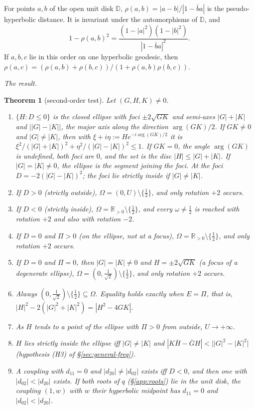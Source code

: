 \documentclass[11pt,reqno]{amsart}
\theoremstyle{plain}
\newtheorem*{theorem}{Theorem}
\theoremstyle{definition}
\theoremstyle{remark}
\newcommand{\R}{\mathbb{R}}
\begin{document}
For points $a,b$ of the open unit disk $\mathbb D$, $\rho(a,b)=|a-b|/|1-\bar ba|$ is the
pseudo-hyperbolic distance. It is invariant under the automorphisms of $\mathbb D$, and
\begin{equation}\label{eq:app-rho}
  1-\rho(a,b)^{2}=\frac{(1-|a|^{2})(1-|b|^{2})}{|1-\bar ba|^{2}} .
\end{equation}
If $a,b,c$ lie in this order on one hyperbolic geodesic, then
$\rho(a,c)=(\rho(a,b)+\rho(b,c))/(1+\rho(a,b)\rho(b,c))$.

\medskip\noindent\emph{The result.}

\begin{theorem}[second-order test]
Let $(G,H,K)\ne0$.
\begin{enumerate}
\item[(a)] $\{H:D\le0\}$ is the closed ellipse with foci $\pm2\sqrt{GK}$ and semi-axes $|G|+|K|$ and
$\bigl||G|-|K|\bigr|$, the major axis along the direction $\arg(GK)/2$. If $GK\ne0$ and $|G|\ne|K|$, then with
$\xi+i\eta:=He^{-i\arg(GK)/2}$ it is $\xi^{2}/(|G|+|K|)^{2}+\eta^{2}/(|G|-|K|)^{2}\le1$. If $GK=0$, the angle
$\arg(GK)$ is undefined, both foci are $0$, and the set is the disc $|H|\le|G|+|K|$. If $|G|=|K|\ne0$, the
ellipse is the segment joining the foci. At the foci $D=-2(|G|-|K|)^{2}$; the foci lie strictly inside if
$|G|\ne|K|$.
\item[(b)] If $D>0$ (strictly outside), $\Omega=(0,U)\setminus\{\frac12\}$, and only rotation $+2$ occurs.
\item[(c)] If $D<0$ (strictly inside), $\Omega=\R_{>0}\setminus\{\frac12\}$, and every $\omega\ne\frac12$ is
reached with rotation $+2$ and also with rotation $-2$.
\item[(d)] If $D=0$ and $\Pi>0$ (on the ellipse, not at a focus), $\Omega=\R_{>0}\setminus\{\frac12\}$, and only
rotation $+2$ occurs.
\item[(e)] If $D=0$ and $\Pi=0$, then $|G|=|K|\ne0$ and $H=\pm2\sqrt{GK}$ (a focus of a degenerate
ellipse), $\Omega=(0,\frac1{\sqrt2})\setminus\{\frac12\}$, and only rotation $+2$ occurs.
\item[(f)] Always $(0,\frac1{\sqrt2})\setminus\{\frac12\}\subseteq\Omega$. Equality holds exactly when $E=\Pi$,
that is, $|H|^{2}-2(|G|^{2}+|K|^{2})=|H^{2}-4GK|$.
\item[(g)] As $H$ tends to a point of the ellipse with $\Pi>0$ from outside, $U\to+\infty$.
\item[(h)] $H$ lies strictly inside the ellipse iff $|G|\ne|K|$ and $|K\bar H-\bar GH|<\bigl||G|^{2}-|K|^{2}\bigr|$
(hypothesis (H3) of \S\ref{sec:general-freq}).
\item[(i)] A coupling with $d_{11}=0$ and $|d_{20}|\ne|d_{02}|$ exists iff $D<0$, and then one with
$|d_{02}|<|d_{20}|$ exists. If both roots of $q$ (\S\ref{app:roots}) lie in the unit disk, the coupling $(1,w)$ with $w$ their
hyperbolic midpoint has $d_{11}=0$ and $|d_{02}|<|d_{20}|$.
\end{enumerate}
\end{theorem}
\end{document}
